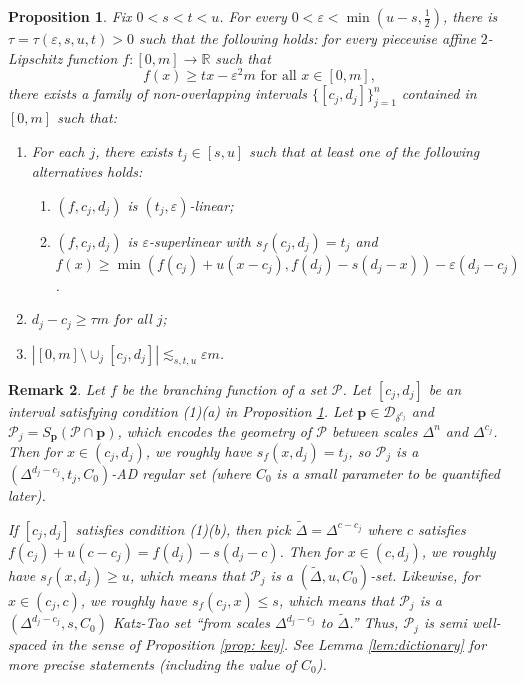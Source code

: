 \documentclass{amsart}
\newtheorem{prop}{Proposition}[section]
\newtheorem{remark}[prop]{Remark}
\newcommand{\R}{\mathbb{R}}
\newcommand{\eps}{\varepsilon}
\newcommand{\lesim}{\lesssim}
\newcommand{\bp}{\mathbf{p}}
\newcommand{\cD}{\mathcal{D}}
\newcommand{\cP}{\mathcal{P}}
\begin{document}
\begin{prop}\label{prop:multiscale}
    Fix $0<s<t<u$. For every $0 < \eps < \min(u-s, \frac{1}{2})$, there is $\tau = \tau(\eps, s,u, t) > 0$ such that the following holds: for every piecewise affine $2$-Lipschitz function $f : [0, m] \to \R$ such that
    \begin{equation*}
        f(x) \ge tx - \eps^2 m \text{ for all } x \in [0, m],
    \end{equation*}
    there exists a family of non-overlapping intervals $\{ [c_j, d_j] \}_{j=1}^n$ contained in $[0, m]$ such that:
    \begin{enumerate}
        \item For each $j$, there exists $t_j \in [s, u]$ such that at least one of the following alternatives holds:
        \begin{enumerate}
            \item $(f, c_j, d_j)$ is $(t_j, \eps)$-linear;

            \item $(f, c_j, d_j)$ is $\eps$-superlinear with $s_f (c_j, d_j) = t_j$ and $f(x) \ge \min(f(c_j) + u(x - c_j), f(d_j) - s(d_j - x)) - \eps(d_j - c_j)$.
        \end{enumerate}

        \item $d_j - c_j \ge \tau m$ for all $j$;

        \item $|[0, m] \setminus \cup_j [c_j, d_j]| \lesim_{s,t,u} \eps m$.
    \end{enumerate}
\end{prop}

\begin{remark}\label{rem:dictionary}
    Let $f$ be the branching function of a set $\cP$. Let $[c_j, d_j]$ be an interval satisfying condition (1)(a) in Proposition \ref{prop:multiscale}. Let $\bp \in \cD_{\delta^{c_j}}$ and $\cP_j = S_\bp (\cP \cap \bp)$, which encodes the geometry of $\cP$ between scales $\Delta^n$ and $\Delta^{c_j}$. Then for $x \in (c_j, d_j)$, we roughly have $s_f (x, d_j) = t_j$, so $\cP_j$ is a $(\Delta^{d_j - c_j}, t_j, C_0)$-AD regular set (where $C_0$ is a small parameter to be quantified later).

    If $[c_j, d_j]$ satisfies condition (1)(b), then pick $\tilde{\Delta}=\Delta^{c-c_j}$ where $c$ satisfies $f(c_j)+u(c-c_j) = f(d_j)-s(d_j-c)$. Then for $x \in (c, d_j)$, we roughly have $s_f (x, d_j) \ge u$, which means that $\cP_j$ is a $(\tilde{\Delta}, u, C_0)$-set. Likewise, for $x \in (c_j, c)$, we roughly have $s_f (c_j, x) \le s$, which means that $\cP_j$ is a $(\Delta^{d_j-c_j}, s, C_0)$ Katz-Tao set ``from scales $\Delta^{d_j-c_j}$ to $\tilde\Delta$.'' Thus, $\cP_j$ is semi well-spaced in the sense of Proposition \ref{prop: key}. See Lemma \ref{lem:dictionary} for more precise statements (including the value of $C_0$).
\end{remark}
\end{document}
